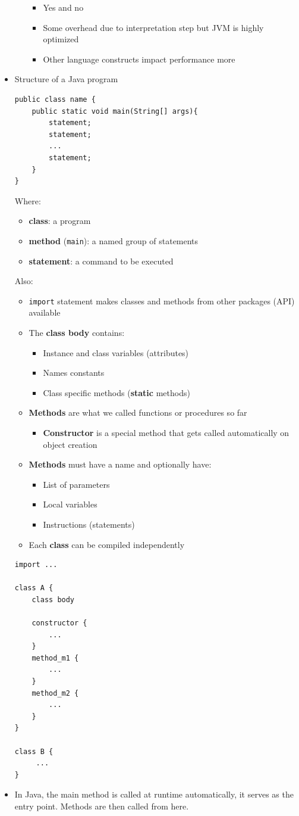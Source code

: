 \documentclass[a4paper]{article}
\newcommand{\inline}[1]{\lstinline!#1!}%
\begin{document}
\begin{itemize}
\begin{itemize}
\begin{itemize}
\item Yes and no
\item Some overhead due to interpretation step but JVM is highly optimized
\item Other language constructs impact performance more
\end{itemize}
\end{itemize}
\item Structure of a Java program
\begin{lstlisting}
public class name {
	public static void main(String[] args){
		statement;
		statement;
		...
		statement;
	}
}
\end{lstlisting}
Where:
\begin{itemize}
\item \textbf{class}: a program
\item\textbf{method} (\inline{main}): a named group of statements
\item \textbf{statement}: a command to be executed
\end{itemize}
Also:
\begin{itemize}
\item \inline{import} statement makes classes and methods from other packages (API) available
\item The \textbf{class body} contains:
\begin{itemize}
\item Instance and class variables (attributes)
\item Names constants
\item Class specific methods (\textbf{static} methods)
\end{itemize}
\item \textbf{Methods} are what we called functions or procedures so far
\begin{itemize}
\item \textbf{Constructor} is a special method that gets called automatically on object creation
\end{itemize}
\item \textbf{Methods} must have a name and optionally have:
\begin{itemize}
\item List of parameters
\item Local variables
\item Instructions (statements)
\end{itemize}
\item Each \textbf{class} can be compiled independently 
\end{itemize}

\begin{lstlisting}
import ...

class A {
	class body
	
	constructor {
	    ...
	}
	method_m1 {
	    ...
	}
	method_m2 {
	    ...
	}
}	

class B {
     ...
}
\end{lstlisting}
\item In Java, the main method is called at runtime automatically, it serves as the entry point. Methods are then called from here.
\end{itemize}
\end{document}
